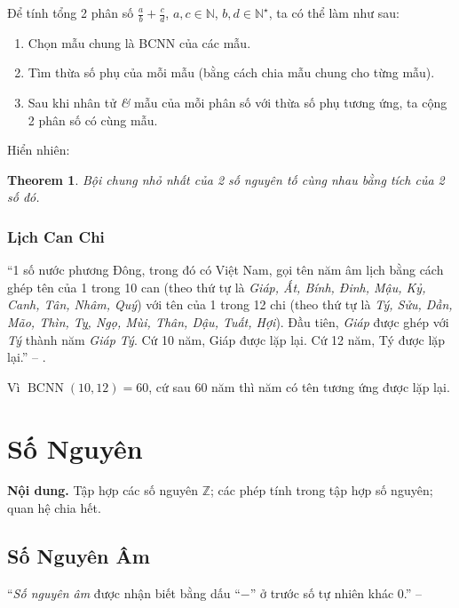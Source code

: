 \documentclass{article}
\numberwithin{equation}{section}
\newtheorem{theorem}{Theorem}[section]
\begin{document}
\begin{tcolorbox}
	Để tính tổng 2 phân số $\frac{a}{b} + \frac{c}{d}$, $a,c\in\mathbb{N}$, $b,d\in\mathbb{N}^\star$, ta có thể làm như sau:
	\begin{enumerate}
		\item Chọn mẫu chung là BCNN của các mẫu.
		\item Tìm thừa số phụ của mỗi mẫu (bằng cách chia mẫu chung cho từng mẫu).
		\item Sau khi nhân tử \textit{\&} mẫu của mỗi phân số với thừa số phụ tương ứng, ta cộng 2 phân số có cùng mẫu.
	\end{enumerate}
\end{tcolorbox}
Hiển nhiên:

\begin{theorem}
	Bội chung nhỏ nhất của 2 số nguyên tố cùng nhau bằng tích của 2 số đó.
\end{theorem}

\subsubsection{Lịch Can Chi}
``1 số nước phương Đông, trong đó có Việt Nam, gọi tên năm âm lịch bằng cách ghép tên của 1 trong 10 can (theo thứ tự là \textit{Giáp, Ất, Bính, Đinh, Mậu, Kỷ, Canh, Tân, Nhâm, Quý}) với tên của 1 trong 12 chi (theo thứ tự là \textit{Tý, Sửu, Dần, Mão, Thìn, Tỵ, Ngọ, Mùi, Thân, Dậu, Tuất, Hợi}). Đầu tiên, \textit{Giáp} được ghép với \textit{Tý} thành năm \textit{Giáp Tý}. Cứ 10 năm, Giáp được lặp lại. Cứ 12 năm, Tý được lặp lại.'' -- \cite[p. 58]{Thai_Anh_Dat_Ha_Loan_Nam_Quang_Toan_6_tap_1}.

Vì $\operatorname{BCNN}(10,12) = 60$, cứ sau 60 năm thì năm có tên tương ứng được lặp lại.


\section{Số Nguyên}
\textbf{Nội dung.} Tập hợp các số nguyên $\mathbb{Z}$; các phép tính trong tập hợp số nguyên; quan hệ chia hết.

\subsection{Số Nguyên Âm}
``\emph{Số nguyên âm} được nhận biết bằng dấu ``$-$'' ở trước số tự nhiên khác 0.'' -- \cite[p. 61]{Thai_Anh_Dat_Ha_Loan_Nam_Quang_Toan_6_tap_1}
\end{document}
